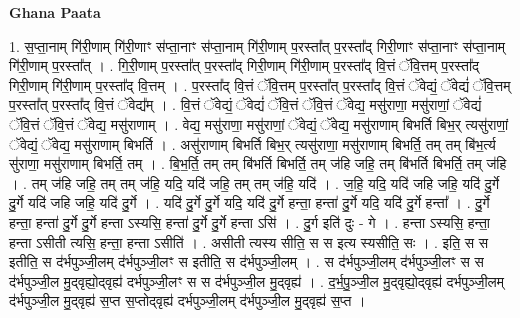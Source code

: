 \documentclass[17pt]{extarticle}
\begin{document}
\textbf{Ghana Paata } \newline

1. स॒प्ता॒नाम् गि॑री॒णाम् गि॑री॒णाꣳ स॑प्ता॒नाꣳ स॑प्ता॒नाम् गि॑री॒णाम् प॒रस्ता᳚त् प॒रस्ता᳚द् गिरी॒णाꣳ स॑प्ता॒नाꣳ स॑प्ता॒नाम् गि॑री॒णाम् प॒रस्ता᳚त् । . गि॒री॒णाम् प॒रस्ता᳚त् प॒रस्ता᳚द् गिरी॒णाम् गि॑री॒णाम् प॒रस्ता᳚द् वि॒त्तं ॅवि॒त्तम् प॒रस्ता᳚द् गिरी॒णाम् गि॑री॒णाम् प॒रस्ता᳚द् वि॒त्तम् । . प॒रस्ता᳚द् वि॒त्तं ॅवि॒त्तम् प॒रस्ता᳚त् प॒रस्ता᳚द् वि॒त्तं ॅवेद्यं॒ ॅवेद्यं॑ ॅवि॒त्तम् प॒रस्ता᳚त् प॒रस्ता᳚द् वि॒त्तं ॅवेद्य᳚म् । . वि॒त्तं ॅवेद्यं॒ ॅवेद्यं॑ ॅवि॒त्तं ॅवि॒त्तं ॅवेद्य॒ मसु॑राणा॒ मसु॑राणां॒ ॅवेद्यं॑ ॅवि॒त्तं ॅवि॒त्तं ॅवेद्य॒ मसु॑राणाम् । . वेद्य॒ मसु॑राणा॒ मसु॑राणां॒ ॅवेद्यं॒ ॅवेद्य॒ मसु॑राणाम् बिभर्ति बिभ॒र् त्यसु॑राणां॒ ॅवेद्यं॒ ॅवेद्य॒ मसु॑राणाम् बिभर्ति । . असु॑राणाम् बिभर्ति बिभ॒र् त्यसु॑राणा॒ मसु॑राणाम् बिभर्ति॒ तम् तम् बि॑भ॒र्त्य सु॑राणा॒ मसु॑राणाम् बिभर्ति॒ तम् । . बि॒भ॒र्ति॒ तम् तम् बि॑भर्ति बिभर्ति॒ तम् ज॑हि जहि॒ तम् बि॑भर्ति बिभर्ति॒ तम् ज॑हि । . तम् ज॑हि जहि॒ तम् तम् ज॑हि॒ यदि॒ यदि॑ जहि॒ तम् तम् ज॑हि॒ यदि॑ । . ज॒हि॒ यदि॒ यदि॑ जहि जहि॒ यदि॑ दु॒र्गे दु॒र्गे यदि॑ जहि जहि॒ यदि॑ दु॒र्गे । . यदि॑ दु॒र्गे दु॒र्गे यदि॒ यदि॑ दु॒र्गे हन्ता॒ हन्ता॑ दु॒र्गे यदि॒ यदि॑ दु॒र्गे हन्ता᳚ । . दु॒र्गे हन्ता॒ हन्ता॑ दु॒र्गे दु॒र्गे हन्ता ऽस्यसि॒ हन्ता॑ दु॒र्गे दु॒र्गे हन्ता ऽसि॑ । . दु॒र्ग इति॑ दुः - गे । . हन्ता ऽस्यसि॒ हन्ता॒ हन्ता ऽसीती त्यसि॒ हन्ता॒ हन्ता ऽसीति॑ । . असीती त्यस्य सीति॒ स स इत्य स्यसीति॒ सः । . इति॒ स स इतीति॒ स द॑र्भपुञ्जी॒लम् द॑र्भपुञ्जी॒लꣳ स इतीति॒ स द॑र्भपुञ्जी॒लम् । . स द॑र्भपुञ्जी॒लम् द॑र्भपुञ्जी॒लꣳ स स द॑र्भपुञ्जी॒ल मु॒द्‌वृह्यो॒द्‌वृह्य॑ दर्भपुञ्जी॒लꣳ स स द॑र्भपुञ्जी॒ल मु॒द्‌वृह्य॑ । . द॒र्भ॒पु॒ञ्जी॒ल मु॒द्‌वृह्यो॒द्‌वृह्य॑ दर्भपुञ्जी॒लम् द॑र्भपुञ्जी॒ल मु॒द्‌वृह्य॑ स॒प्त स॒प्तोद्‌वृह्य॑ दर्भपुञ्जी॒लम् द॑र्भपुञ्जी॒ल मु॒द्‌वृह्य॑ स॒प्त । \newline
\end{document}
